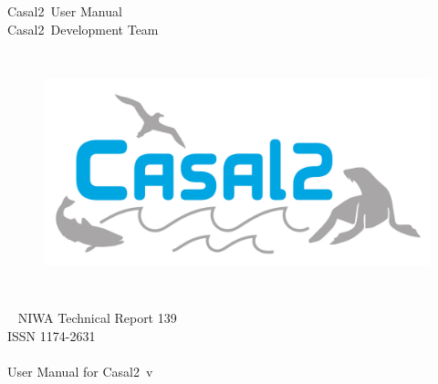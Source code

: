 \documentclass[a4paper,11pt,twoside,pdftex]{article}
\newcommand{\DocYear}{\SourceControlYearDoc}
\newcommand{\VER}{v\Version} %
\newcommand{\CNAME}{Casal2}
\newcommand{\authors}{\CNAME\ Development Team}
\begin{document}
\sloppy %


\begin{titlepage}
  \thispagestyle{empty} %
	\begin{center}

		\vspace*{2.5cm}
		\Huge \CNAME\ User Manual \\

		\vspace{2.0cm}
		\huge \authors %

		\vspace{2cm}
		\begin{figure}[htp]
			\begin{center}
			 \includegraphics[height=7cm]{Figures/CASAL2.png}
			\end{center}
		\end{figure}

		~\vfill
		\Large NIWA Technical Report 139 \\%
		\Large ISSN 1174-2631 \\%
		\Large \DocYear \\%

		\vspace{1.0cm}
		User Manual for \CNAME\ \VER

	\end{center}
\end{titlepage}

\cleardoublepage{}
\fancyfoot[C]{\thepage}
\end{document}

